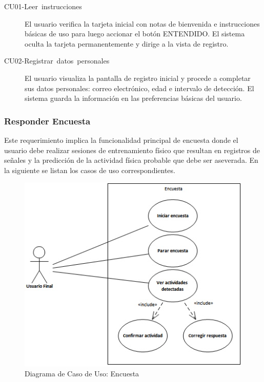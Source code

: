 \begin{description}
\item [{CU01-Leer~instrucciones}] El usuario verifica la tarjeta inicial
con notas de bienvenida e instrucciones básicas de uso para luego
accionar el botón \flqq{}ENTENDIDO\frqq{}. El sistema oculta la
tarjeta permanentemente y dirige a la vista de registro.
\item [{CU02-Registrar~datos~personales}] El usuario visualiza la pantalla
de registro inicial y procede a completar sus datos personales: correo
electrónico, edad e intervalo de detección. El sistema guarda la información
en las preferencias básicas del usuario.
\end{description}

\subsubsection{Responder Encuesta}

Este requerimiento implica la funcionalidad principal de encuesta
donde el usuario debe realizar sesiones de entrenamiento físico que
resultan en registros de señales y la predicción de la actividad física
probable que debe ser aseverada. En la siguiente 
se listan los casos de uso correspondientes.

\begin{figure}[H]
\begin{centering}
\includegraphics{capitulo-5/graphics/caso_encuesta}
\par\end{centering}
\caption[Diagrama de Caso de Uso: Encuesta]{\label{fig5:uc-encuesta}Diagrama de Caso de Uso: Encuesta}

\end{figure}

